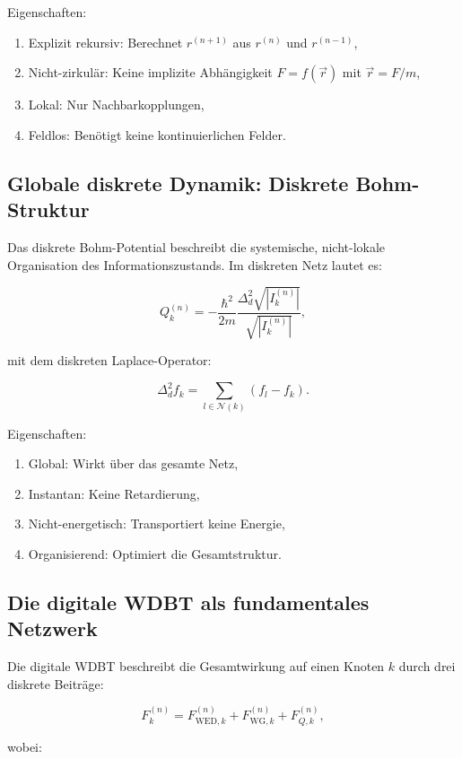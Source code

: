 Eigenschaften:

\begin{enumerate}
    \item Explizit rekursiv: Berechnet \( r^{(n+1)} \) aus \( r^{(n)} \) und \( r^{(n-1)} \),
    \item Nicht-zirkulär: Keine implizite Abhängigkeit \( F = f(\vec{r}) \) mit \( \vec{r} = F/m \),
    \item Lokal: Nur Nachbarkopplungen,
    \item Feldlos: Benötigt keine kontinuierlichen Felder.
\end{enumerate}

\subsection{Globale diskrete Dynamik: Diskrete Bohm-Struktur}
\label{sub:diskrete_bohm_struktur}

Das diskrete Bohm-Potential beschreibt die systemische, nicht-lokale Organisation des Informationszustands. Im diskreten Netz lautet es:

\[
Q_k^{(n)} = -\frac{\hbar^2}{2m} \frac{\Delta_d^2 \sqrt{|I_k^{(n)}|}}{\sqrt{|I_k^{(n)}|}},
\]

mit dem diskreten Laplace-Operator:

\[
\Delta_d^2 f_k = \sum_{l \in \mathcal{N}(k)} (f_l - f_k).
\]

Eigenschaften:

\begin{enumerate}
    \item Global: Wirkt über das gesamte Netz,
    \item Instantan: Keine Retardierung,
    \item Nicht-energetisch: Transportiert keine Energie,
    \item Organisierend: Optimiert die Gesamtstruktur.
\end{enumerate}

\subsection{Die digitale WDBT als fundamentales Netzwerk}
\label{sub:digitale_wdbt}

Die digitale WDBT beschreibt die Gesamtwirkung auf einen Knoten \( k \) durch drei diskrete Beiträge:

\[
F_k^{(n)} = F_{\text{WED},k}^{(n)} + F_{\text{WG},k}^{(n)} + F_{Q,k}^{(n)},
\]

wobei:

